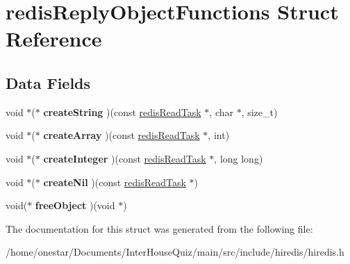 \hypertarget{structredis_reply_object_functions}{\section{redis\+Reply\+Object\+Functions Struct Reference}
\label{structredis_reply_object_functions}
}
\subsection*{Data Fields}
\begin{DoxyCompactItemize}
\item 
\hypertarget{structredis_reply_object_functions_a47bd3ed3c51bd6feb2db769d9aa948b7}{void $\ast$($\ast$ {\bfseries create\+String} )(const \hyperlink{structredis_read_task}{redis\+Read\+Task} $\ast$, char $\ast$, size\+\_\+t)}\label{structredis_reply_object_functions_a47bd3ed3c51bd6feb2db769d9aa948b7}

\item 
\hypertarget{structredis_reply_object_functions_abe27d2fb5a23ad5895d0da80df1d0984}{void $\ast$($\ast$ {\bfseries create\+Array} )(const \hyperlink{structredis_read_task}{redis\+Read\+Task} $\ast$, int)}\label{structredis_reply_object_functions_abe27d2fb5a23ad5895d0da80df1d0984}

\item 
\hypertarget{structredis_reply_object_functions_a42f7e404e59a904f438bfcf2c9f3b90c}{void $\ast$($\ast$ {\bfseries create\+Integer} )(const \hyperlink{structredis_read_task}{redis\+Read\+Task} $\ast$, long long)}\label{structredis_reply_object_functions_a42f7e404e59a904f438bfcf2c9f3b90c}

\item 
\hypertarget{structredis_reply_object_functions_a2eb4f8ed1cbfc2d308ef7af04e2400d0}{void $\ast$($\ast$ {\bfseries create\+Nil} )(const \hyperlink{structredis_read_task}{redis\+Read\+Task} $\ast$)}\label{structredis_reply_object_functions_a2eb4f8ed1cbfc2d308ef7af04e2400d0}

\item 
\hypertarget{structredis_reply_object_functions_a92b1f2f51735adc868147e8fa42a9ce8}{void($\ast$ {\bfseries free\+Object} )(void $\ast$)}\label{structredis_reply_object_functions_a92b1f2f51735adc868147e8fa42a9ce8}

\end{DoxyCompactItemize}


The documentation for this struct was generated from the following file\+:\begin{DoxyCompactItemize}
\item 
/home/onestar/\+Documents/\+Inter\+House\+Quiz/main/src/include/hiredis/hiredis.\+h\end{DoxyCompactItemize}
